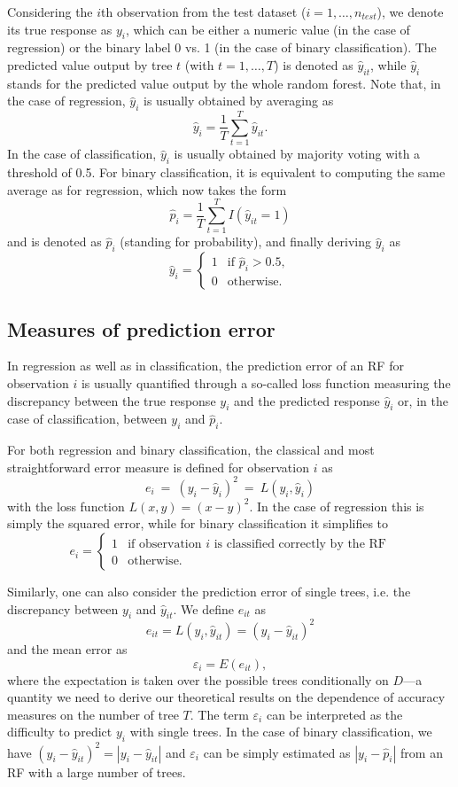 \documentclass[paper=a4
               ,12pt
               ,DIV=12
               ,parskip=half
               ,titlepage=on
               ,headinclude 
               ,footinclude
               ,headsepline
               ,footsepline         %
               ,ilines 
               ]{scrartcl}
\begin{document}
Considering the $i$th observation from the test dataset ($i=1,\dots,n_{test}$), we denote its true response as $y_i$, which can be either a numeric value (in the case of regression) or the binary label 0 vs. 1 (in the case of binary classification).
The predicted value output by tree $t$ (with $t=1,\dots,T$) is denoted as $\hat{y}_{it}$, while $\hat{y}_i$ stands for the predicted value output by the whole random forest. Note that, in the case of regression, $\hat{y}_i$ is usually obtained by averaging as 
\[
\hat{y}_i=\frac{1}{T}\sum_{t=1}^T\hat{y}_{it}.
\]
In the case of classification, $\hat{y}_i$ is usually obtained by majority voting with a threshold of 0.5. For binary classification, it is equivalent to computing the same average as for regression, which now takes the form
\[
\hat{p}_i=\frac{1}{T}\sum_{t=1}^TI(\hat{y}_{it}=1)
\] 
and is denoted as $\hat{p}_i$ (standing for probability), and finally deriving $\hat{y}_i$ as
\[
   \hat{y}_{i} =
   \begin{cases}     1 & \text{if }\hat{p}_i>0.5,  \\
     0 & \text{otherwise.}
   \end{cases}
\]


\subsection{Measures of prediction error}
\label{subsec:errormeasures}
In regression as well as in classification, the prediction error of an RF for observation $i$ is usually quantified through a so-called loss function measuring the discrepancy between the true response $y_i$ and the predicted response $\hat{y}_i$ or, in the case of classification, between $y_i$ and $\hat{p}_i$. 

For both regression and binary classification, the classical and most straightforward error measure is defined for observation $i$ as 
\[
e_{i}\ =\ (y_i-\hat{y}_{i})^2\ =\ L(y_i,\hat{y}_{i})
\]
with the loss function $L(x,y)=(x-y)^2$. In the case of regression this is simply the squared error, while for binary classification it simplifies to
\[
   e_{i} =
   \begin{cases}     1 & \text{if observation } i \text{ is classified correctly by the RF}  \\
     0 & \text{otherwise.}
   \end{cases}
\]

Similarly, one can also consider the prediction error of single trees, i.e. the discrepancy between $y_i$ and $\hat{y}_{it}$. We define $e_{it}$ as 
\[
e_{it}=L(y_i,\hat{y}_{it})=(y_i-\hat{y}_{it})^2
\]
and the mean error as
\[
\varepsilon_i = E(e_{it}),
\]
where the expectation is taken over the possible trees conditionally on $D$---a quantity we need to derive our theoretical results on the dependence of accuracy measures on the number of tree $T$. The term $\varepsilon_i$ can be interpreted as the difficulty to predict $y_i$ with single trees. 
In the case of binary classification, we have $(y_i-\hat{y}_{it})^2=|y_i-\hat{y}_{it}|$ and $\varepsilon_i$ can be simply estimated as $|y_i-\hat{p}_i|$  from an RF with a large number of trees. 
\end{document}
